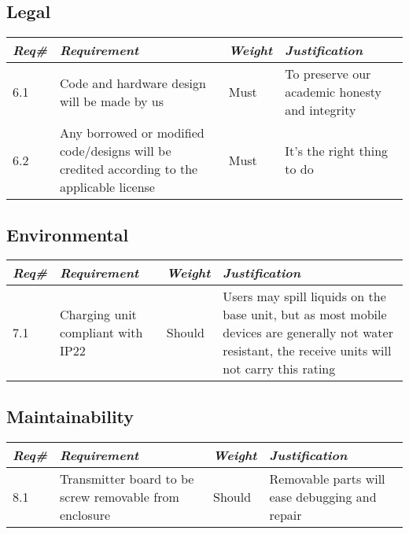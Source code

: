     \subsection{Legal}
        \begin{centering}
        \begin{tabular}{|l|m{7cm}|l|m{7cm}|} \hline
        \textit{\textbf{Req\#}}	& \textit{\textbf{Requirement}} &\textit{\textbf{Weight}}&\textit{\textbf{Justification}} \\ \hline
        6.1	& Code and hardware design will be made by us & Must	& To preserve our academic honesty and integrity \\ \hline
        6.2	& Any borrowed or modified code/designs will be credited according to the applicable license & Must	&It's the right thing to do\\ \hline
        \end{tabular}
        \end{centering}
    
    \subsection{Environmental }
        \begin{centering}
        \begin{tabular}{|l|m{7cm}|l|m{7cm}|} \hline
        \textit{\textbf{Req\#}}	& \textit{\textbf{Requirement}} &\textit{\textbf{Weight}}&\textit{\textbf{Justification}} \\ \hline
        7.1	& Charging unit compliant with IP22	\cite{iprating} & Should & Users may spill liquids on the base unit, but as most mobile devices are generally not water resistant, the receive units will not carry this rating \\ \hline
        \end{tabular}
        \end{centering}

    \subsection{Maintainability}
        \begin{centering}
        \begin{tabular}{|l|m{7cm}|l|m{7cm}|} \hline
        \textit{\textbf{Req\#}}	& \textit{\textbf{Requirement}} &\textit{\textbf{Weight}}&\textit{\textbf{Justification}} \\ \hline
        8.1 & Transmitter board to be screw removable from enclosure & Should & Removable parts will ease debugging and repair \\ \hline
        \end{tabular}
        \end{centering}

